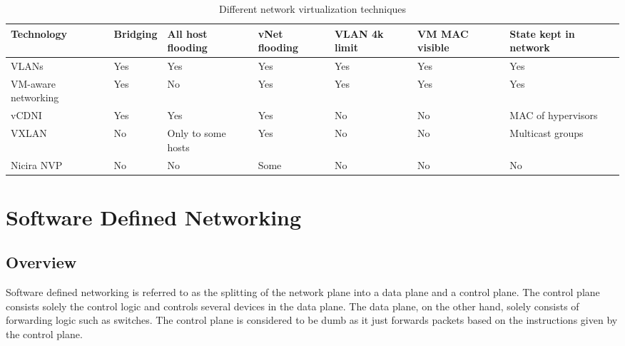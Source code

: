 \begin{table}
\centering
\begin{tabular}{| p{6em} | p{5em} | p{1cm} | p{1cm} | p{5em} | p{5em} | p{5em} |}
\hline
{\bf Technology} & {\bf Bridging} & {\bf All host flooding } & {\bf vNet flooding} & {\bf VLAN 4k limit} & {\bf VM MAC visible} & {\bf State kept in network}\\ \hline
%
VLANs & Yes & Yes & Yes & Yes & Yes & Yes \\ \hline
%
VM-aware networking & Yes & No & Yes & Yes & Yes & Yes \\ \hline
vCDNI & Yes & Yes & Yes & No & No & MAC of hypervisors \\ \hline
VXLAN & No & Only to some hosts & Yes & No & No & Multicast groups \\ \hline
Nicira NVP & No & No & Some & No & No & No \\ \hline
\end{tabular}
\caption{Different network virtualization techniques}
\label{table:1}
\end{table}

\section{Software Defined Networking}
\subsection{Overview}
Software defined networking is referred to as the splitting of the network plane into a data plane and a control plane. The control plane consists solely the control logic and controls several devices in the data plane. The data plane, on the other hand, solely consists of forwarding logic such as switches. The control plane is considered to be dumb as it just forwards packets based on the instructions given by the control plane.

